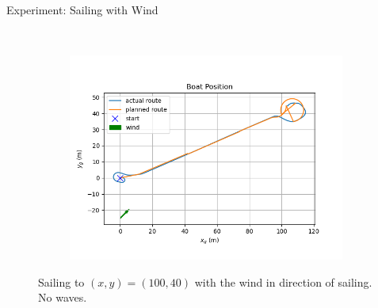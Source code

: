 \documentclass[10pt,xcolor={table,dvipsnames},t]{beamer}
\begin{document}
\begin{frame}{Experiment: Sailing with Wind}
\begin{figure}
\begin{subfigure}[b]{0.4\textwidth}
         \label{fig:with_wind_speed}
     \end{subfigure}
     \hfill\\
     \begin{subfigure}[b]{0.4\textwidth}
         \centering
         \includegraphics[width=\textwidth,trim={0.5cm 1cm 1.25cm 1.5cm },clip]{documents/final_pres_figs/with_wind_to_40_40_pos.png}
         \label{fig:with_wind_pos}
     \end{subfigure}
    \caption{Sailing to \((x,y)=(100,40)\) with the wind in direction of sailing. No waves.}
    \label{fig:sail_with_wind}
\end{figure}
\end{frame}
\end{document}
